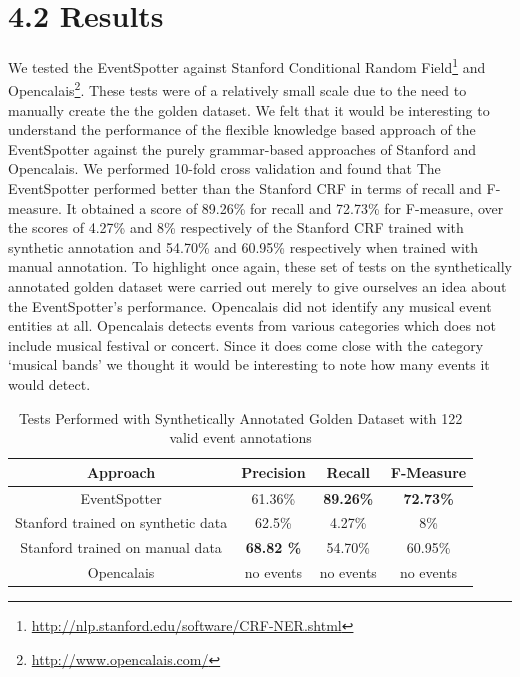 \documentclass[a4paper,11pt]{report}
\begin{document}
\section*{4.2 Results}
We tested the EventSpotter against Stanford Conditional Random Field\footnote{\url{http://nlp.stanford.edu/software/CRF-NER.shtml}} and Opencalais\footnote{\url{http://www.opencalais.com/}}. These tests were of a relatively small scale due to the need to manually create the the golden dataset. We felt that it would be interesting to understand the performance of the flexible knowledge based approach of the EventSpotter against the purely grammar-based approaches of Stanford and Opencalais. We performed 10-fold cross validation and found that The EventSpotter performed better than the Stanford CRF in terms of recall and F-measure. It obtained a score of 89.26\% for recall and 72.73\% for F-measure, over the scores of 4.27\% and 8\% respectively of the Stanford CRF trained with synthetic annotation and 54.70\% and 60.95\% respectively when trained with manual annotation. To highlight once again, these set of tests on the synthetically annotated golden dataset were carried out merely to give ourselves an idea about the EventSpotter's performance. Opencalais did not identify any musical event entities at all. Opencalais detects events from various categories which does not include musical festival or concert. Since it does come close with the category `musical bands' we thought it would be interesting to note how many events it would detect.
\begin{table}[ht]
\caption{Tests Performed with Synthetically Annotated Golden Dataset with 122 valid event annotations} %
\centering %
\begin{tabular}{c c c c} %
\hline\hline %
Approach & Precision & Recall & F-Measure \\ [0.5ex] %
\hline %
EventSpotter & 61.36\% & \bf 89.26\% \bf & \bf 72.73\% \bf \\ %
Stanford trained on synthetic data & 62.5\% & 4.27\% & 8\%\\
Stanford trained on manual data & \bf 68.82 \bf \% & 54.70\% & 60.95\% \\
Opencalais & no events & no events & no events \\
\hline %
\end{tabular}
\label{table:nonlin} %
\end{table}
\end{document}
